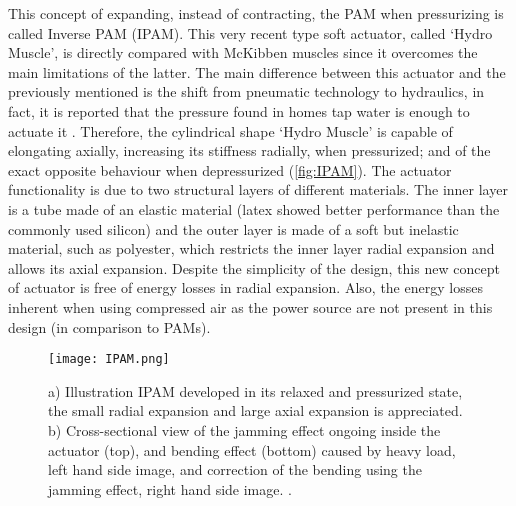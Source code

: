This concept of expanding, instead of contracting, the PAM when pressurizing is called Inverse PAM (IPAM). This very recent type soft actuator, called `Hydro Muscle', is directly compared with McKibben muscles since it overcomes the main limitations of the latter. The main difference between this actuator and the previously mentioned is the shift from pneumatic technology to hydraulics, in fact, it is reported that the pressure found in homes tap water is enough to actuate it \cite{Sridar2016}. Therefore, the cylindrical shape `Hydro Muscle' is capable of elongating axially, increasing its stiffness radially, when pressurized; and of the exact opposite behaviour when depressurized (\autoref{fig:IPAM}). The actuator functionality is due to two structural layers of different materials. The inner layer is a tube made of an elastic material (latex showed better performance than the commonly used silicon) and the outer layer is made of a soft but inelastic material, such as polyester, which restricts the inner layer radial expansion and allows its axial expansion. Despite the simplicity of the design, this new concept of actuator is free of energy losses in radial expansion. Also, the energy losses inherent when using compressed air as the power source are not present in this design (in comparison to PAMs).
\begin{figure}[hbtp!]
    \centering
    \texttt{[image: IPAM.png]}
    \caption{a) Illustration IPAM developed in its relaxed and pressurized state, the small radial expansion and large axial expansion is appreciated. b) Cross-sectional view of the jamming effect ongoing inside the actuator (top), and bending effect (bottom) caused by heavy load, left hand side image, and correction of the bending using the jamming effect, right hand side image. \cite{Sridar2016}. }
    \label{fig:IPAM}
\end{figure}

